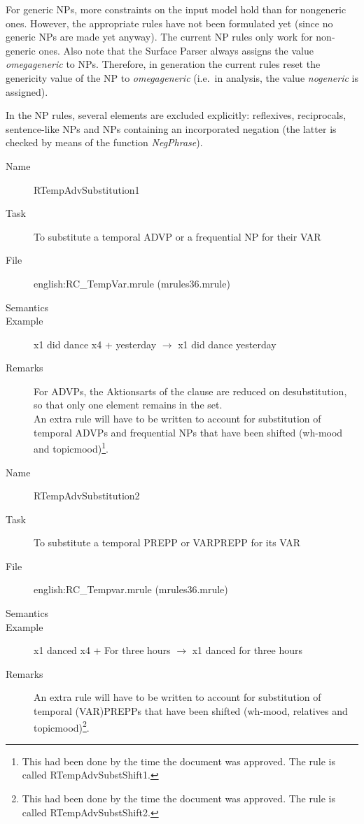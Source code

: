 \begin{description}
For generic NPs, more constraints on the input model hold than for nongeneric 
ones.
However, the appropriate rules have not been formulated yet (since no generic 
NPs are made yet anyway). The current NP rules only work for non-generic ones.
Also note that the Surface Parser always assigns the value {\em omegageneric\/} 
to NPs. Therefore, in generation the current rules reset the genericity 
value of the NP to {\em omegageneric\/} (i.e.\ in analysis, the value {\em 
nogeneric\/} is assigned).

In the NP rules, several elements are excluded explicitly: reflexives, 
reciprocals, sentence-like NPs and NPs containing an incorporated negation (the 
latter is checked by means of the function {\em NegPhrase\/}).

\vspace{1 cm}
\begin{description}
\item[Name] RTempAdvSubstitution1
\item[Task] To substitute a temporal ADVP or a frequential NP for their VAR
\item[File] english:RC\_TempVar.mrule (mrules36.mrule)
\item[Semantics]
\item[Example] x1 did dance x4 + yesterday $\rightarrow$ x1 did dance yesterday
\item[Remarks] For ADVPs, the Aktionsarts of the clause are reduced on 
desubstitution, so that only one element remains in the set.\\
An extra rule will have to be written to account for substitution of temporal 
ADVPs and frequential NPs that have been shifted (wh-mood and 
topicmood)\footnote{This had been done by the time the document was approved. 
The rule is called RTemp\-Adv\-SubstShift1.}.
\end{description}

\vspace{1 cm}
\begin{description}
\item[Name] RTempAdvSubstitution2
\item[Task] To substitute a temporal PREPP or VARPREPP for its VAR
\item[File] english:RC\_Tempvar.mrule (mrules36.mrule)
\item[Semantics]
\item[Example] x1 danced x4 + For three hours $\rightarrow$ x1 danced for three 
hours
\item[Remarks]
An extra rule will have to be written to account for substitution of temporal 
(VAR)PREPPs that have been shifted (wh-mood, relatives and 
topicmood)\footnote{This had been done by the time the document was approved. 
The rule is called RTemp\-Adv\-SubstShift2.}.
\end{description}


\end{description}
